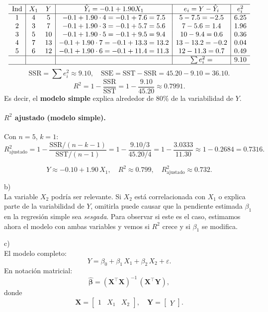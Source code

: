 \documentclass[10pt,a4paper]{article}
\begin{document}
\begin{enumerate}
\[
\begin{array}{c|cc|c|c|c}
\hline
\text{Ind} & X_1 & Y 
& \hat{Y}_i = -0.1 +1.90X_1
& e_i= Y-\hat{Y}_i
& e_i^2
\\\hline
1 & 4 & 5 
& -0.1 +1.90\cdot4 =-0.1 +7.6=7.5
& 5-7.5=-2.5
& 6.25
\\
2 & 3 &7
& -0.1 +1.90\cdot3 =-0.1 +5.7=5.6
& 7-5.6=1.4
& 1.96
\\
3 & 5 &10
& -0.1 +1.90\cdot5 =-0.1 +9.5=9.4
& 10-9.4=0.6
& 0.36
\\
4 & 7 &13
& -0.1 +1.90\cdot7 =-0.1 +13.3=13.2
& 13-13.2=-0.2
& 0.04
\\
5 & 6 &12
& -0.1 +1.90\cdot6 =-0.1 +11.4=11.3
& 12-11.3=0.7
& 0.49
\\
\hline
& & & & \sum e_i^2= & 9.10
\\\hline
\end{array}
\]
\[
\text{SSR} = \sum e_i^2 \approx 9.10,
\quad
\text{SSE} = \text{SST} - \text{SSR} = 45.20 -9.10=36.10.
\]
\[
R^2
= 1 - \frac{\text{SSR}}{\text{SST}}
= 1 - \frac{9.10}{45.20}
\approx 0.7991.
\]
Es decir, el \textbf{modelo simple} explica alrededor de $80\%$ de la variabilidad de $Y$.

\paragraph{$R^2$ ajustado (modelo simple).}

Con $n=5$, $k=1$:
\[
R_{\text{ajustado}}^2
= 1 - \frac{\text{SSR}/(n - k -1)}{\text{SST}/(n-1)}
= 1 - \frac{9.10/3}{45.20/4}
= 1 - \frac{3.0333}{11.30}
\approx 1 -0.2684
= 0.7316.
\]


\[
Y \approx -0.10 +1.90\,X_1,
\quad
R^2 \approx 0.799,
\quad
R_{\text{ajustado}}^2 \approx 0.732.
\]

b) \\
La variable $X_2$ podr\'ia ser relevante. Si $X_2$ est\'a correlacionada con $X_1$ o explica parte de la variabilidad de $Y$, omitirla puede causar que la pendiente estimada $\beta_1$ en la regresión simple sea \emph{sesgada}. Para observar si este es el caso, estimamos ahora el modelo con ambas variables y vemos si $R^2$ crece y si $\beta_1$ se modifica.

c) \\

El modelo completo:
\[
Y = \beta_0 + \beta_1\,X_1 + \beta_2\,X_2 + \varepsilon.
\]
En notaci\'on matricial:
\[
\hat{\boldsymbol{\beta}}
= (\mathbf{X}^\top \mathbf{X})^{-1} \, (\mathbf{X}^\top \mathbf{Y}),
\]
donde
\[
\mathbf{X}
=
\begin{bmatrix}
1 & X_1 & X_2
\end{bmatrix},
\quad
\mathbf{Y}
=
\begin{bmatrix}
Y
\end{bmatrix}.
\]



\end{enumerate}
\end{document}
